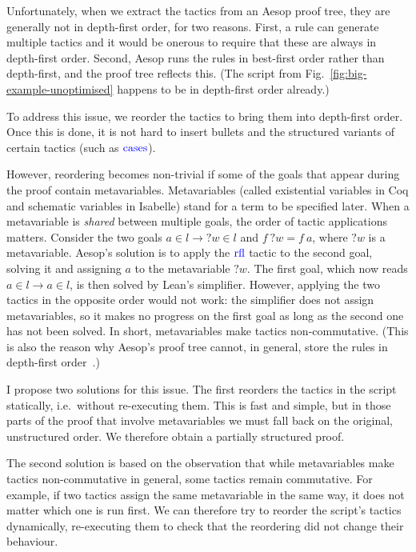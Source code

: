 \documentclass[sigplan,10pt,anonymous,review]{acmart}
\newcommand{\tac}[1]{\ensuremath{\mathrm{\mathcolor{blue}{#1}}}}
\newcommand{\mvar}[1]{{?#1}}
\begin{document}
Unfortunately, when we extract the tactics from an Aesop proof tree, they are generally not in depth-first order, for two reasons.
First, a rule can generate multiple tactics and it would be onerous to require that these are always in depth-first order.
Second, Aesop runs the rules in best-first order rather than depth-first, and the proof tree reflects this.
(The script from Fig.~\ref{fig:big-example-unoptimised} happens to be in depth-first order already.)

To address this issue, we reorder the tactics to bring them into depth-first order.
Once this is done, it is not hard to insert bullets and the structured variants of certain tactics (such as \tac{cases}).

However, reordering becomes non-trivial if some of the goals that appear during the proof contain metavariables.
Metavariables (called existential variables in Coq and schematic variables in Isabelle) stand for a term to be specified later.
When a metavariable is \emph{shared} between multiple goals, the order of tactic applications matters.
Consider the two goals $a ∈ l → \mvar{w} ∈ l$ and $f~\mvar{w} = f~a$, where $\mvar{w}$ is a metavariable.
Aesop's solution is to apply the \tac{rfl} tactic to the second goal, solving it and assigning $a$ to the metavariable $\mvar{w}$.
The first goal, which now reads $a ∈ l → a ∈ l$, is then solved by Lean's simplifier.
However, applying the two tactics in the opposite order would not work: the simplifier does not assign metavariables, so it makes no progress on the first goal as long as the second one has not been solved.
In short, metavariables make tactics non-commutative.
(This is also the reason why Aesop's proof tree cannot, in general, store the rules in depth-first order~\cite[Sec.~4]{Aesop}.)

I propose two solutions for this issue.
The first reorders the tactics in the script statically, i.e.\ without re-executing them.
This is fast and simple, but in those parts of the proof that involve metavariables we must fall back on the original, unstructured order.
We therefore obtain a partially structured proof.

The second solution is based on the observation that while metavariables make tactics non-commutative in general, some tactics remain commutative.
For example, if two tactics assign the same metavariable in the same way, it does not matter which one is run first.
We can therefore try to reorder the script's tactics dynamically, re-executing them to check that the reordering did not change their behaviour.
\end{document}

